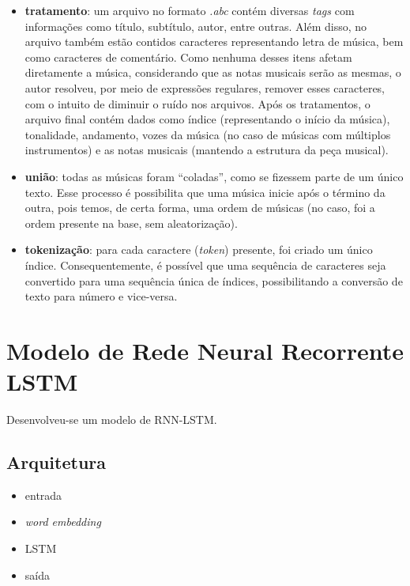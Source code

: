 \documentclass{automatextcc}
\begin{document}
\begin{itemize}
    \item \textbf{tratamento}: um arquivo no formato \textit{.abc} contém diversas \textit{tags} com informações como título, subtítulo, autor, entre outras. Além disso, no arquivo também estão contidos caracteres representando letra de música, bem como caracteres de comentário. Como nenhuma desses itens afetam diretamente a música, considerando que as notas musicais serão as mesmas, o autor resolveu, por meio de expressões regulares, remover esses caracteres, com o intuito de diminuir o ruído nos arquivos. Após os tratamentos, o arquivo final contém dados como índice (representando o início da música), tonalidade, andamento, vozes da música (no caso de músicas com múltiplos instrumentos) e as notas musicais (mantendo a estrutura da peça musical).
    \item \textbf{união}: todas as músicas foram ``coladas'', como se fizessem parte de um único texto. Esse processo é possibilita que uma música inicie após o término da outra, pois temos, de certa forma, uma ordem de músicas (no caso, foi a ordem presente na base, sem aleatorização).
    \item \textbf{tokenização}: para cada caractere (\textit{token}) presente, foi criado um único índice. Consequentemente, é possível que uma sequência de caracteres seja convertido para uma sequência única de índices, possibilitando a conversão de texto para número e vice-versa.
\end{itemize}

\section{Modelo de Rede Neural Recorrente LSTM}
Desenvolveu-se um modelo de RNN-LSTM. %

\subsection{Arquitetura}

\begin{itemize}
    \item entrada 
    \item \textit{word embedding} 
    \item LSTM 
    \item saída   
\end{itemize}

\end{document}
